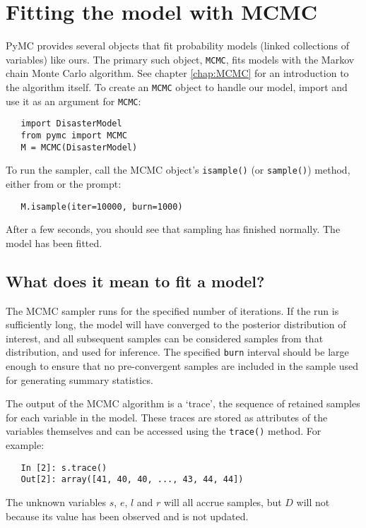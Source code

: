 \section*{Fitting the model with MCMC}

PyMC provides several objects that fit probability models (linked collections of variables) like ours. The primary such object, \texttt{MCMC}, fits models with the Markov chain Monte Carlo algorithm. See chapter \ref{chap:MCMC} for an introduction to the algorithm itself. To create an \texttt{MCMC} object to handle our model, import  and use it as an argument for \texttt{MCMC}:
\begin{verbatim}
   import DisasterModel
   from pymc import MCMC
   M = MCMC(DisasterModel)
\end{verbatim}
To run the sampler, call the MCMC object's \texttt{isample()} (or \texttt{sample()}) method, either from  or the prompt:
\begin{verbatim}
   M.isample(iter=10000, burn=1000)
\end{verbatim}
After a few seconds, you should see that sampling has finished normally. The model has been fitted.

\subsection*{What does it mean to fit a model?}

The MCMC sampler runs for the specified number of iterations. If the run is sufficiently long, the model will have converged to the posterior distribution of interest, and all subsequent samples can be considered samples from that distribution, and used for inference. The specified \texttt{burn} interval should be large enough to ensure that no pre-convergent samples are included in the sample used for generating summary statistics.

The output of the MCMC algorithm is a `trace', the sequence of retained samples for each variable in the model. These traces are stored as attributes of the variables themselves and can be accessed using the \texttt{trace()} method. For example:
\begin{verbatim}
   In [2]: s.trace()
   Out[2]: array([41, 40, 40, ..., 43, 44, 44])
\end{verbatim}
The unknown variables $s$, $e$, $l$ and $r$ will all accrue samples, but $D$ will not because its value has been observed and is not updated.

